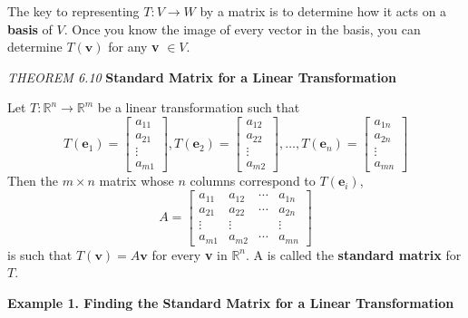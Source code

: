 \documentclass{article}
\newcommand\R{\mathbb{R}}
\begin{document}
    The key to representing $T: V \to W$ by a matrix is to determine how it acts on a \textbf{basis} of $V$. Once you know the
    image of every vector in the basis, you can determine $T( \textbf{v} )$ for any \textbf{v} $\in V$.
    \begin{tcolorbox}[colback = {blue9}]
        \textit{THEOREM 6.10} \textbf{Standard Matrix for a Linear Transformation}

        Let $T: \R^n  \to \R^m $ be a linear transformation such that
        \[ T( \textbf{e}_1 ) = \begin{bmatrix}
            a_{11} \\
            a_{21} \\
            \vdots \\
            a_{m1}
        \end{bmatrix} , 
        T( \textbf{e}_2 ) = \begin{bmatrix}
            a_{12} \\
            a_{22} \\
            \vdots \\
            a_{m2}
        \end{bmatrix}, \dots, 
        T( \textbf{e}_n ) = \begin{bmatrix}
            a_{1n} \\
            a_{2n} \\
            \vdots \\
            a_{mn}
        \end{bmatrix} \]
        Then the $m \times n$ matrix whose $n$ columns correspond to $T( \textbf{e}_i )$,
        \[ A = \begin{bmatrix}
            a_{11} & a_{12} & \cdots & a_{1n} \\
            a_{21} & a_{22} & \cdots & a_{2n} \\
            \vdots & \vdots & & \vdots \\
            a_{m1} & a_{m 2} & \cdots & a_{m n}
        \end{bmatrix} \]
        is such that $T( \textbf{v}) = A \textbf{v}$ for every \textbf{v} in $ \R^n $. A is called the \textbf{standard matrix} for $T$.
    \end{tcolorbox}

    \textbf{Example 1. \textcolor{blue5}{Finding the Standard Matrix for a Linear Transformation}}
\end{document}
